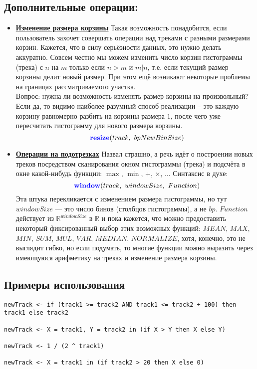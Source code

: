 \subsection*{Дополнительные операции:}
\begin{itemize}
	\item \textbf{\underline{Изменение размера корзины}} Такая возможность понадобится, если пользователь захочет совершать операции над треками с разными размерами корзин. Кажется, что в силу серьёзности данных, это нужно делать аккуратно. Совсем честно мы можем изменить число корзин гистограммы (трека) с $n$ на $m$ только если $n > m$ и $m | n$, т.е. если текущий размер корзины делит новый размер. При этом ещё возникают некоторые проблемы на границах рассматриваемого участка.\\
	Вопрос: нужна ли возможность изменять размер корзины на произвольный? Если да, то видимо наиболее разумный способ реализации -- это каждую корзину равномерно разбить на корзины размера $1$, после чего уже пересчитать гистограмму для нового размера корзины.
	\[
		\kw { resize}(track,\ bpNewBinSize) 
	\]
	\item \textbf{\underline{Операции на подотрезках}} Назвал страшно, а речь идёт о построении новых треков посредством сканирования окном гистограммы (трека) и подсчёта в окне какой-нибудь функции: $\max$, $\min$, $+$, $\times$, $\ldots$ Синтаксис в духе:
	\[
		\kw { window}(track,\ windowSize,\ Function) 
	\]
	Эта штука перекликается с изменением размера гистограммы, но тут $windowSize$ --- это число бинов (столбцов гистограммы), а не $bp$.
	$Function$ действует из $\mathbb{R}^{windowSize}$ в $\mathbb{R}$ и пока кажется, что можно предоставить некоторый фиксированный выбор этих возможных функций: $MEAN$, $MAX$, $MIN$, $SUM$, $MUL$, $VAR$, $MEDIAN$, $NORMALIZE$, хотя, конечно, это не выглядит гибко, но если подумать, то многие функции можно выразить через имеющуюся арифметику на треках и изменение размера корзины.
\end{itemize}

\subsection*{Примеры использования}
\begin{lstlisting}
newTrack <- if (track1 >= track2 AND track1 <= track2 + 100) then track1 else track2

newTrack <- X = track1, Y = track2 in (if X > Y then X else Y)

newTrack <- 1 / (2 ^ track1)

newTrack <- X = track1 in (if track2 > 20 then X else 0)
\end{lstlisting}

